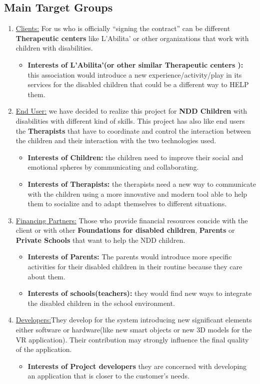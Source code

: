 \documentclass [12pt]{article}
\begin{document}
\subsection{Main Target Groups}
\begin{enumerate}
\item \underline{Clients:} For us who is officially  “signing  the  contract” can be different \textbf{Therapeutic centers} like L’Abilita’ or other organizations that work with children with disabilities.
\begin{itemize}[•]
\item \textbf{Interests of L’Abilita’(or other similar Therapeutic centers ):} this association would  introduce a new experience/activity/play in its services for the disabled children that could be a different way to HELP them.
\end{itemize}
\item \underline{End User:} we have decided to realize this project for \textbf{NDD Children} with disabilities with different kind of skills. 
This project has also like end users the \textbf{Therapists} that have to coordinate and control the interaction between the children and their interaction with the two technologies used.
\begin{itemize}[•]
\item \textbf{Interests of Children:} the children need to improve their social and emotional spheres by communicating and collaborating.
\item \textbf{Interests of Therapists:} the therapists need a new way to  communicate with the children using a more innovative and modern tool able to help them to socialize and to adapt themselves to different situations.
\end{itemize}
\item \underline{Financing Partners:} Those who provide financial resources concide with the client or with other \textbf{Foundations for disabled children}, \textbf{Parents} or \textbf{Private Schools} that want to help the NDD children.
\begin{itemize}[•]
\item \textbf{Interests of Parents:} The parents would introduce more specific activities for their disabled children in their routine because they care about them.
\item \textbf{Interests of schools(teachers):} they would find new ways to integrate the disabled children in the school environment.
\end{itemize}
\item \underline{Developers:}They develop for the system introducing new significant elements  either software or hardware(like new smart objects or new 3D models for the VR application).
Their contribution may strongly influence the final quality of the application.
\begin{itemize}[•]
\item \textbf{Interests of Project developers} they are concerned with developing an application that is closer to the customer's needs.
\end{itemize}
\end{enumerate}
\end{document}
